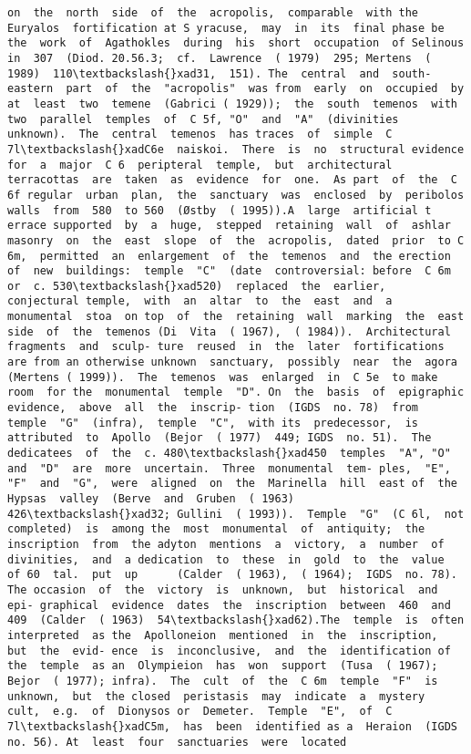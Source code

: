 \documentclass[11pt]{article}
\begin{document}
\begin{Verbatim}[commandchars=\\\{\}]
 on  the  north  side  of  the  acropolis,  comparable  with the  Euryalos  fortification at S yracuse,  may  in  its  final phase be  the  work  of  Agathokles  during  his  short  occupation  of Selinous  in  307  (Diod. 20.56.3;  cf.  Lawrence  ( 1979)  295; Mertens  ( 1989)  110\textbackslash{}xad31,  151). The  central  and  south-eastern  part  of  the  "acropolis"  was from  early  on  occupied  by  at  least  two  temene  (Gabrici ( 1929));  the  south  temenos  with  two  parallel  temples  of  C 5f, "O"  and  "A"  (divinities  unknown).  The  central  temenos  has traces  of  simple  C 7l\textbackslash{}xadC6e  naiskoi.  There  is  no  structural evidence  for  a  major  C 6  peripteral  temple,  but  architectural terracottas  are  taken  as  evidence  for  one.  As part  of  the  C 6f regular  urban  plan,  the  sanctuary  was  enclosed  by  peribolos walls  from  580  to 560  (Østby  ( 1995)).A  large  artificial t errace supported  by  a  huge,  stepped  retaining  wall  of  ashlar masonry  on  the  east  slope  of  the  acropolis,  dated  prior  to C 6m,  permitted  an  enlargement  of  the  temenos  and  the erection  of  new  buildings:  temple  "C"  (date  controversial: before  C 6m  or  c. 530\textbackslash{}xad520)  replaced  the  earlier,  conjectural temple,  with  an  altar  to  the  east  and  a  monumental  stoa  on top  of  the  retaining  wall  marking  the  east  side  of  the  temenos (Di  Vita  ( 1967),  ( 1984)).  Architectural  fragments  and  sculp- ture  reused  in  the  later  fortifications are from an otherwise unknown  sanctuary,  possibly  near  the  agora  (Mertens ( 1999)).  The  temenos  was  enlarged  in  C 5e  to make  room  for the  monumental  temple  "D". On  the  basis  of  epigraphic  evidence,  above  all  the  inscrip- tion  (IGDS  no. 78)  from  temple  "G"  (infra),  temple  "C",  with its  predecessor,  is  attributed  to  Apollo  (Bejor  ( 1977)  449; IGDS  no. 51).  The  dedicatees  of  the  c. 480\textbackslash{}xad450  temples  "A", "O"  and  "D"  are  more  uncertain.  Three  monumental  tem- ples,  "E",  "F"  and  "G",  were  aligned  on  the  Marinella  hill  east of  the  Hypsas  valley  (Berve  and  Gruben  ( 1963)  426\textbackslash{}xad32; Gullini  ( 1993)).  Temple  "G"  (C 6l,  not  completed)  is  among the  most  monumental  of  antiquity;  the  inscription  from  the adyton  mentions  a  victory,  a  number  of  divinities,  and  a dedication  to  these  in  gold  to  the  value  of 60  tal.  put  up      (Calder  ( 1963),  ( 1964);  IGDS  no. 78).  The occasion  of  the  victory  is  unknown,  but  historical  and  epi- graphical  evidence  dates  the  inscription  between  460  and 409  (Calder  ( 1963)  54\textbackslash{}xad62).The  temple  is  often  interpreted  as the  Apolloneion  mentioned  in  the  inscription,  but  the  evid- ence  is  inconclusive,  and  the  identification of  the  temple  as an  Olympieion  has  won  support  (Tusa  ( 1967);  Bejor  ( 1977); infra).  The  cult  of  the  C 6m  temple  "F"  is  unknown,  but  the closed  peristasis  may  indicate  a  mystery  cult,  e.g.  of  Dionysos or  Demeter.  Temple  "E",  of  C 7l\textbackslash{}xadC5m,  has  been  identified as a  Heraion  (IGDS  no. 56). At  least  four  sanctuaries  were  located 
\end{Verbatim}
\end{document}
